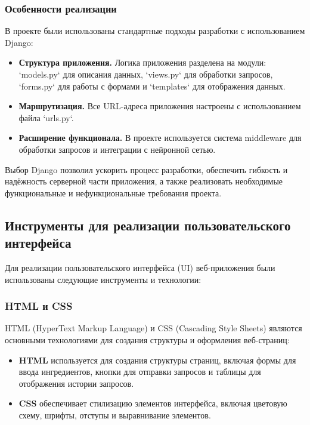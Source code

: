 {{\subsubsection*{Особенности реализации}
В проекте были использованы стандартные подходы разработки с использованием Django:
\begin{itemize}
    \item \textbf{Структура приложения.} Логика приложения разделена на модули: `models.py` для описания данных, `views.py` для обработки запросов, `forms.py` для работы с формами и `templates` для отображения данных.
    \item \textbf{Маршрутизация.} Все URL-адреса приложения настроены с использованием файла `urls.py`.
    \item \textbf{Расширение функционала.} В проекте используется система middleware для обработки запросов и интеграции с нейронной сетью.
\end{itemize}

Выбор Django позволил ускорить процесс разработки, обеспечить гибкость и надёжность серверной части приложения, а также реализовать необходимые функциональные и нефункциональные требования проекта.
}
\subsection{Инструменты для реализации пользовательского интерфейса}
Для реализации пользовательского интерфейса (UI) веб-приложения были использованы следующие инструменты и технологии:

\subsubsection*{HTML и CSS}
HTML (HyperText Markup Language) и CSS (Cascading Style Sheets) являются основными технологиями для создания структуры и оформления веб-страниц:
\begin{itemize}
    \item \textbf{HTML} используется для создания структуры страниц, включая формы для ввода ингредиентов, кнопки для отправки запросов и таблицы для отображения истории запросов.
    \item \textbf{CSS} обеспечивает стилизацию элементов интерфейса, включая цветовую схему, шрифты, отступы и выравнивание элементов.
\end{itemize}

}
